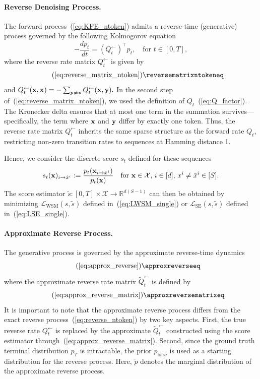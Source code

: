 \documentclass{article} %
\def\eqref#1{equation~\ref{#1}}
\newcommand{\bfx}{{\bf x}}
\newcommand{\bfy}{ {\bf y}}
\newcommand{\xito}{\mathbf{x}_{i \to \hat{x}^i}}
\newcommand{\sito}{s_t(\bfx)_{i \to \hat{x}^i}}
\newcommand{\backQt}{Q_t^{\leftarrow}}
\newcommand{\LWSM}{\mathcal{L}_{\mathrm{WSM}}}
\newcommand{\LSE}{\mathcal{L}_{\mathrm{SE}}}
\renewcommand{\eqref}[1]{\textup{(\ref{#1})}}
\begin{document}
\paragraph{Reverse Denoising Process.} The forward process~\eqref{eq:KFE_ntoken} admits a reverse-time (generative) process 
governed by the following Kolmogorov equation~\citep{kelly1979reversibility}
\begin{equation}\label{eq:reverse_ntoken}
    -\frac{dp_{t}}{dt} = (Q_{t}^{\leftarrow})^\top p_{t}, \quad \text{for } t \in [0, T],
\end{equation}
where the reverse rate matrix $Q_{t}^{\leftarrow}$ is given by
\begin{equation}\tag{\ref*{eq:reverse_matrix_ntoken}}
    \reversematrixntokeneq
\end{equation}
and $\backQt(\bfx, \bfx) = -\sum_{\bfy \neq \bfx} \backQt(\bfx, \bfy).$
In the second step of~\eqref{eq:reverse_matrix_ntoken}, we used the definition of $Q_t$~\eqref{eq:Q_factor}. The Kronecker delta ensures that at most one term in the summation survives---specifically, the term where $\bfx$ and $\bfy$ differ by exactly one token. Thus, the reverse rate matrix $\backQt$ inherits the same sparse structure as the forward rate $Q_t$, restricting non-zero transition rates to sequences at Hamming distance 1. 

Hence, we consider the discrete score $s_t$ defined for these sequences
\begin{equation*}
    \sito := \frac{p_t(\xito)}{p_t(\bfx)} \quad \text{for } \bfx \in \mathcal{X}, \, i\in [d], \, x^i\neq \hat{x}^i \in [S].
\end{equation*}
The score estimator $\tilde{s}: [0, T] \times \mathcal{X} \to \mathbb{R}^{d(S-1)}$ can then be obtained by minimizing $\LWSM(s, \tilde{s})$ defined in~\eqref{eq:LWSM_single} or $\LSE(s, \tilde{s})$ defined in~\eqref{eq:LSE_single}.

\paragraph{Approximate Reverse Process.}
The generative process is governed by the approximate reverse-time dynamics
\begin{equation}\tag{\ref*{eq:approx_reverse}}
 \approxreverseeq
\end{equation}
where the approximate reverse rate matrix $\tilde{Q}_t^{\leftarrow}$ is defined by 
\begin{equation}\tag{\ref*{eq:approx_reverse_matrix}} 
    \approxreversematrixeq
\end{equation}
It is important to note that the approximate reverse process differs from the exact reverse process~\eqref{eq:reverse_ntoken} by two key aspects. First, the true reverse rate $\backQt$ is replaced by the approximate $\tilde{Q}_t^{\leftarrow}$ constructed using the score estimator through~\eqref{eq:approx_reverse_matrix}. Second, since the ground truth terminal distribution $p_T$ is intractable, the prior $p_{\mathrm{base}}$ is used as a starting distribution for the reverse process. Here, $\tilde{p}$ denotes the marginal distribution of the approximate reverse process.
\end{document}
